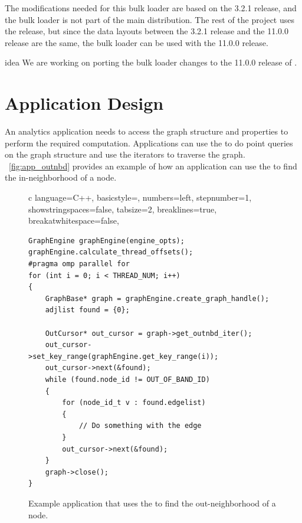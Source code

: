 The modifications needed for this bulk loader are based on the \wt{} 3.2.1 release, and the bulk loader is not part of the main \wt{} distribution.
The rest of the project uses the  release, but since the data layouts between the 3.2.1 release and the 11.0.0 release are the same, the bulk loader can be used with the 11.0.0 release.
\begin{statusbar}{idea}
  We are working on porting the bulk loader changes to the 11.0.0 release of \wt{}.
\end{statusbar}

\section{Application Design}
\label{arch:application}

An analytics application needs to access the graph structure and properties to perform the required computation.
Applications can use the \api{} to do point queries on the graph structure and use the iterators to traverse the graph.
~\autoref{fig:app_outnbd} provides an example of how an application can use the \api{} to find the in-neighborhood of a node.

\begin{figure}[h!] %
\centering          %
\begin{tabular}{c}  %
\lstset
{ %
      language=C++,
      basicstyle=\tiny\ttfamily,
      numbers=left,
      stepnumber=1,
      showstringspaces=false,
      tabsize=2,
      breaklines=true,
      breakatwhitespace=false,
}
\begin{lstlisting}[style=cpp,label=lst:app]
GraphEngine graphEngine(engine_opts);
graphEngine.calculate_thread_offsets();
#pragma omp parallel for 
for (int i = 0; i < THREAD_NUM; i++)
{
    GraphBase* graph = graphEngine.create_graph_handle();
    adjlist found = {0};

    OutCursor* out_cursor = graph->get_outnbd_iter();
    out_cursor->set_key_range(graphEngine.get_key_range(i));
    out_cursor->next(&found);
    while (found.node_id != OUT_OF_BAND_ID)
    {
        for (node_id_t v : found.edgelist)
        {
            // Do something with the edge
        }
        out_cursor->next(&found);
    }
    graph->close();
}
\end{lstlisting}
\end{tabular}
\caption{Example application that uses the \api{} to find the out-neighborhood of a node.}
\label{fig:app_outnbd}
\end{figure}

